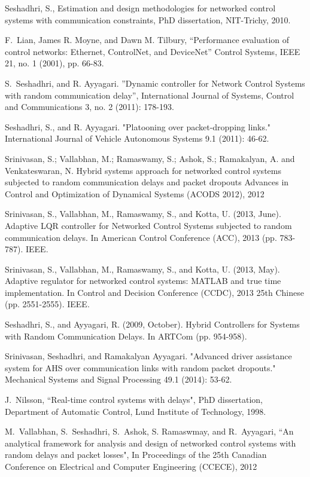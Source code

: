 \documentclass[letterpaper, 10 pt, conference]{ieeeconf}
\begin{document}
\begin{thebibliography}{1}
Seshadhri, S., Estimation and design methodologies for networked control systems with communication constraints, PhD dissertation, NIT-Trichy, 2010.

F.~Lian,  James R. Moyne, and Dawn M. Tilbury, ``Performance
evaluation of control networks: Ethernet, ControlNet, and DeviceNet''
Control Systems, IEEE 21, no. 1 (2001), pp. 66-83.


 S.~Seshadhri,  and R. Ayyagari. ''Dynamic controller for Network
Control Systems with random communication delay'', International
Journal of Systems, Control and Communications 3, no. 2 (2011):
178-193.

 Seshadhri, S., and R. Ayyagari. "Platooning over packet-dropping links." International Journal of Vehicle Autonomous Systems 9.1 (2011): 46-62.






Srinivasan, S.; Vallabhan, M.; Ramaswamy, S.; Ashok, S.; Ramakalyan, A. and Venkateswaran, N. Hybrid systems approach for networked control systems subjected to random communication delays and packet dropouts Advances in Control and Optimization of Dynamical Systems (ACODS 2012), 2012

Srinivasan, S., Vallabhan, M., Ramaswamy, S., and Kotta, U. (2013, June). Adaptive LQR controller for Networked Control Systems subjected to random communication delays. In American Control Conference (ACC), 2013 (pp. 783-787). IEEE.

Srinivasan, S., Vallabhan, M., Ramaswamy, S., and Kotta, U. (2013, May). Adaptive regulator for networked control systems: MATLAB and true time implementation. In Control and Decision Conference (CCDC), 2013 25th Chinese (pp. 2551-2555). IEEE.

Seshadhri, S., and Ayyagari, R. (2009, October). Hybrid Controllers for Systems with Random Communication Delays. In ARTCom (pp. 954-958).

Srinivasan, Seshadhri, and Ramakalyan Ayyagari. "Advanced driver assistance system for AHS over communication links with random packet dropouts." Mechanical Systems and Signal Processing 49.1 (2014): 53-62.


J.~Nilsson, ``Real-time control systems with delays", 
PhD dissertation, Department of Automatic Control, Lund Institute
of Technology, 1998.

M.~Vallabhan, S.~Seshadhri, S.~Ashok,  S. Ramaswmay, and R.~Ayyagari, ``An analytical framework for analysis and design of networked control systems with random delays and packet losses",  In Proceedings of the 25th Canadian Conference on Electrical and Computer Engineering (CCECE), 2012


\end{thebibliography}
\end{document}
